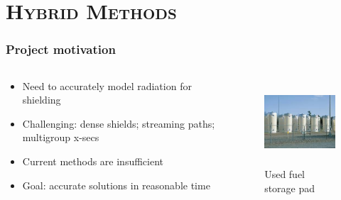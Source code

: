\documentclass[xcolor=x11names,compress]{beamer}
\renewcommand{\(}{\begin{columns}}
\renewcommand{\)}{\end{columns}}
\newcommand{\<}[1]{\begin{column}{#1}}
\renewcommand{\>}{\end{column}}
\begin{document}
\section{\scshape Hybrid Methods}
\begin{frame}[fragile]
  \frametitle{Project motivation}

\begin{columns}
  \begin{column}{0.55\textwidth}
	\begin{itemize}
	\item Need to accurately model radiation for shielding
	\item \alert{Challenging}: dense shields; streaming paths; multigroup x-secs
	\item Current methods are insufficient
	\item \alert{Goal}: accurate solutions in reasonable time
	\end{itemize}
  \end{column}
  \begin{column}{0.45\textwidth}
  	\begin{figure}
  	\begin{center}
  		\includegraphics[height=1.25in,clip]{../figs/isfsi}
		\caption{Used fuel storage pad}
	\end{center}
  	\end{figure}
  \end{column}
\end{columns}

\end{frame}
\end{document}
